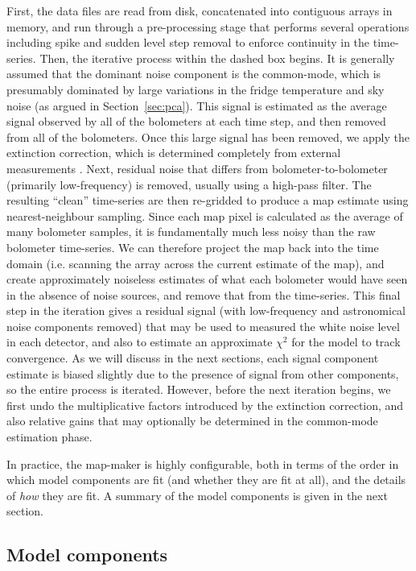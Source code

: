 \documentclass[useAMS,usenatbib,nofootinbib]{mn2e}
\begin{document}
First, the data files are read from disk, concatenated into contiguous
arrays in memory, and run through a pre-processing stage that performs
several operations including spike and sudden level step removal to
enforce continuity in the time-series. Then, the iterative process
within the dashed box begins. It is generally assumed that the
dominant noise component is the common-mode, which is presumably
dominated by large variations in the fridge temperature and sky noise
(as argued in Section~\ref{sec:pca}). This signal is estimated as the
average signal observed by all of the bolometers at each time step,
and then removed from all of the bolometers. Once this large signal
has been removed, we apply the extinction correction, which is
determined completely from external measurements
\citep[see][]{dempsey2012}. Next, residual noise that differs from
bolometer-to-bolometer (primarily low-frequency) is removed, usually
using a high-pass filter. The resulting ``clean'' time-series are then
re-gridded to produce a map estimate using nearest-neighbour
sampling. Since each map pixel is calculated as the average of many
bolometer samples, it is fundamentally much less noisy than the raw
bolometer time-series. We can therefore project the map back into the
time domain (i.e. scanning the array across the current estimate of
the map), and create approximately noiseless estimates of what each
bolometer would have seen in the absence of noise sources, and remove
that from the time-series. This final step in the iteration gives a
residual signal (with low-frequency and astronomical noise components
removed) that may be used to measured the white noise level in each
detector, and also to estimate an approximate $\chi^2$ for the model
to track convergence. As we will discuss in the next sections, each
signal component estimate is biased slightly due to the presence of
signal from other components, so the entire process is
iterated. However, before the next iteration begins, we first undo the
multiplicative factors introduced by the extinction correction, and
also relative gains that may optionally be determined in the
common-mode estimation phase.

In practice, the map-maker is highly configurable, both in terms of
the order in which model components are fit (and whether they are fit
at all), and the details of \emph{how} they are fit. A summary of the
model components is given in the next section.

\subsection{Model components}
\label{sec:components}
\end{document}
